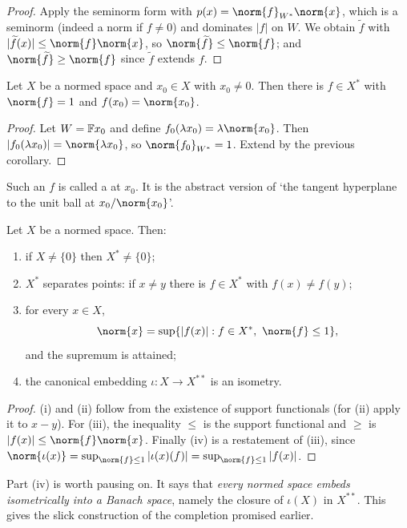 \documentclass[a4paper]{scrartcl}
\newcommand{\wt}{\widetilde}
\begin{document}
\begin{proof}
	Apply the seminorm form with $p(x) = \norm{f}_{W^*}\norm{x}$, which is a seminorm (indeed a norm if $f \neq 0$) and dominates $|f|$ on $W$. We obtain $\wt f$ with $|\wt f(x)| \leq \norm{f}\norm{x}$, so $\norm{\wt f} \leq \norm{f}$; and $\norm{\wt f} \geq \norm{f}$ since $\wt f$ extends $f$.
\end{proof}

\begin{corollary}
	Let $X$ be a normed space and $x_0 \in X$ with $x_0 \neq 0$. Then there is $f \in X^*$ with $\norm{f} = 1$ and $f(x_0) = \norm{x_0}$.
\end{corollary}

\begin{proof}
	Let $W = \mathbb{F} x_0$ and define $f_0(\lambda x_0) = \lambda \norm{x_0}$. Then $|f_0(\lambda x_0)| = \norm{\lambda x_0}$, so $\norm{f_0}_{W^*} = 1$. Extend by the previous corollary.
\end{proof}

Such an $f$ is called a  at $x_0$. It is the abstract version of `the tangent hyperplane to the unit ball at $x_0/\norm{x_0}$'.

\begin{corollary}
	Let $X$ be a normed space. Then:
	\begin{enumerate}[label=(\roman*)]
		\item if $X \neq \{0\}$ then $X^* \neq \{0\}$;
		\item $X^*$ separates points: if $x \neq y$ there is $f \in X^*$ with $f(x) \neq f(y)$;
		\item for every $x \in X$,
		$$\norm{x} = \sup \{ |f(x)| : f \in X^*, \ \norm{f} \leq 1 \},$$
		and the supremum is attained;
		\item the canonical embedding $\iota : X \to X^{**}$ is an isometry.
	\end{enumerate}
\end{corollary}

\begin{proof}
	(i) and (ii) follow from the existence of support functionals (for (ii) apply it to $x - y$). For (iii), the inequality $\leq$ is the support functional and $\geq$ is $|f(x)| \leq \norm{f}\norm{x}$. Finally (iv) is a restatement of (iii), since $\norm{\iota(x)} = \sup_{\norm{f}\leq 1}|\iota(x)(f)| = \sup_{\norm{f}\leq 1}|f(x)|$.
\end{proof}

Part (iv) is worth pausing on. It says that \emph{every normed space embeds isometrically into a Banach space}, namely the closure of $\iota(X)$ in $X^{**}$. This gives the slick construction of the completion promised earlier.
\end{document}
